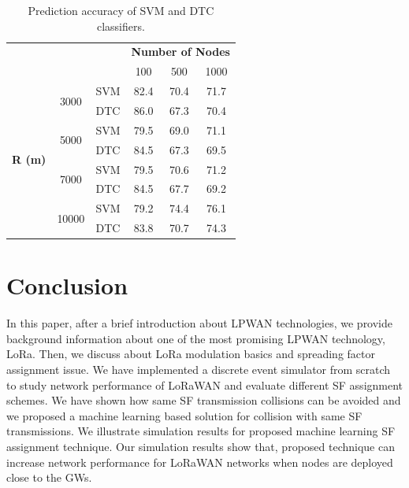 \documentclass[conference]{IEEEtran}
\begin{document}
\begin{table}
\centering
\caption{Prediction accuracy of SVM and DTC classifiers.}
\label{table:prediction_accuracy}
\begin{tabular}{|c|c|c|c|c|c|}
\hline
\multicolumn{3}{|c|}{\multirow{2}{*}{}}                        & \multicolumn{3}{c|}{\textbf{Number of Nodes}} \\ \cline{4-6}
\multicolumn{3}{|c|}{}                                         & 100           & 500           & 1000          \\ \hline
\multirow{8}{*}{\textbf{R (m)}} & \multirow{2}{*}{3000}  & SVM & 82.4          & 70.4          & 71.7          \\ \cline{3-6}
                                &                        & DTC & 86.0          & 67.3          & 70.4          \\ \cline{2-6}

                                & \multirow{2}{*}{5000}  & SVM & 79.5          & 69.0          & 71.1          \\ \cline{3-6}
                                &                        & DTC & 84.5          & 67.3          & 69.5          \\ \cline{2-6}

                                & \multirow{2}{*}{7000}  & SVM & 79.5          & 70.6          & 71.2          \\ \cline{3-6}
                                &                        & DTC & 84.5          & 67.7          & 69.2          \\ \cline{2-6}

                                & \multirow{2}{*}{10000} & SVM & 79.2          & 74.4          & 76.1          \\ \cline{3-6}
                                &                        & DTC & 83.8          & 70.7          & 74.3          \\ \hline
\end{tabular}
\end{table}


\section{Conclusion} \label{Conclusion}
\par In this paper, after a brief introduction about LPWAN technologies, we provide background information about one of the most promising LPWAN technology, LoRa. Then, we discuss about LoRa modulation basics and spreading factor assignment issue. We have implemented a discrete event simulator from scratch to study network performance of LoRaWAN and evaluate different SF assignment schemes. We have shown how same SF transmission collisions can be avoided and we proposed a machine learning based solution for collision with same SF transmissions. We illustrate simulation results for proposed machine learning SF assignment technique. Our simulation results show that, proposed technique can increase network performance for LoRaWAN networks when nodes are deployed close to the GWs.
\end{document}
